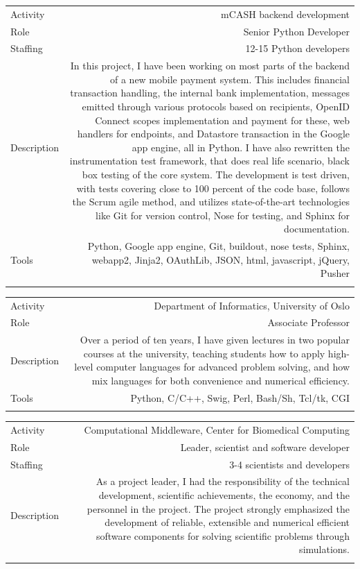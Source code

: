 \documentclass[english,a4paper,11pt]{article}
\begin{document}
\begin{tabular}{@{}LR}
Activity & mCASH backend development\\
Role & Senior Python Developer\\
Staffing & 12-15 Python developers\\
Description & In this project, I have been working on most parts of the backend of a new mobile payment system. This includes financial transaction handling, the internal bank implementation, messages emitted through various protocols based on recipients, OpenID Connect scopes implementation and payment for these, web handlers for endpoints, and Datastore transaction in the Google app engine, all in Python. I have also rewritten the instrumentation test framework, that does real life scenario, black box testing of the core system. The development is test driven, with tests covering close to 100 percent of the code base, follows the Scrum agile method, and utilizes state-of-the-art technologies like Git for version control, Nose for testing, and Sphinx for documentation. \\
Tools & Python, Google app engine, Git, buildout, nose tests, Sphinx, webapp2, Jinja2, OAuthLib, JSON, html, javascript, jQuery, Pusher\\ 
\addlinespace \bottomrule[.1pt] \addlinespace
   \end{tabular}

\begin{tabular}{@{}LR}
Activity & Department of Informatics, University of Oslo\\
Role & Associate Professor\\
Description & Over a period of ten years, I have given lectures in two popular courses at the university, teaching students how to apply high-level computer languages for advanced problem solving, and how mix languages for both convenience and numerical efficiency.\\
Tools & Python, C/C++, Swig, Perl, Bash/Sh, Tcl/tk, CGI\\ 
\addlinespace \bottomrule[.1pt] \addlinespace
   \end{tabular}

\begin{tabular}{@{}LR}
Activity & Computational Middleware, Center for Biomedical Computing\\
Role & Leader, scientist and software developer\\
Staffing & 3-4 scientists and developers\\
Description & As a project leader, I had the responsibility of the technical development, scientific achievements, the economy, and the personnel in the project. The project strongly emphasized the development of reliable, extensible and numerical efficient software components for solving scientific problems through simulations.\\ 
\addlinespace \bottomrule[.1pt] \addlinespace
   \end{tabular}
\end{document}
